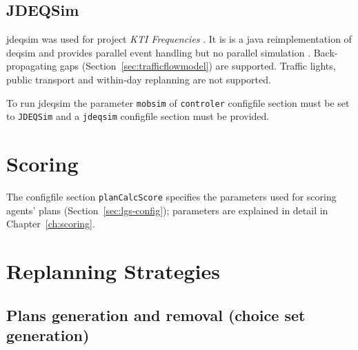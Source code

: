 \subsection{JDEQSim}
\label{sec:using-jdeqsim}
\gls{jdeqsim} \citep[][]{WaraichEtAl_TechRep_IVT_2009, WaraichEtAl_STRC_2009} was used for project \emph{KTI Frequencies} \citep[][]{BalmerEtAl_ResRep_datapuls_2010}. It is is a \gls{java} reimplementation of \gls{deqsim} \citep[][]{WaraichEtAl_STRC_2009, CharyparEtAl_TRR_2007, CharyparEtAl_TRB_2009} and provides parallel event handling but no parallel simulation \citep[][p.11]{BalmerEtAl_ResRep_datapuls_2010}. Back-propagating gaps (Section~\ref{sec:trafficflowmodel}) are supported. Traffic lights, public transport and within-day replanning are not supported.

To run \gls{jdeqsim} the parameter \lstinline|mobsim| of \lstinline|controler| \gls{configfile} section must be set to \lstinline|JDEQSim| and a \lstinline|jdeqsim| \gls{configfile} section must be provided. 

\section{Scoring}
\label{sec:using-scoring}
The \gls{configfile} section \lstinline|planCalcScore| specifies the parameters used for scoring agents' plans (Section~\ref{sec:lgs-config}); parameters are explained in detail in Chapter~\ref{ch:scoring}.


\section{Replanning Strategies}
\label{sec:strategymodules}

\subsection{Plans generation and removal (choice set generation)}

